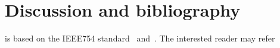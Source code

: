 









\section{Discussion and bibliography}%
\label{sec:discussion_and_bibliograhpy}
 is based on the IEEE754 standard~\cite{ieee754} and~\cite{MR2265914}.
The interested reader may refer
